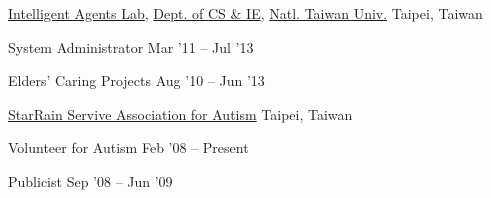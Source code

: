 \documentclass[10pt, a4paper]{article} %
\begin{document}

\headedsection
{\href{http://agent.csie.ntu.edu.tw/}{Intelligent Agents Lab}, 
 \href{http://www.csie.ntu.edu.tw}{Dept. of CS \& IE},
 \href{http://www.ntu.edu.tw}{Natl. Taiwan Univ.}}
{Taipei, Taiwan}{

	\headedsubsection
	{System Administrator}
	{Mar '11 -- Jul '13}
	{}

	\headedsubsection
	{Elders' Caring Projects}
	{Aug '10 -- Jun '13}
	{}
}


\headedsection
{\href{http://goo.gl/2Dmqrj}{StarRain Servive Association for Autism}}
{Taipei, Taiwan}{

	\headedsubsection
	{Volunteer for Autism} 
	{Feb '08 -- Present}
	{}

	\headedsubsection
	{Publicist} 
	{Sep '08 -- Jun '09}
	{} 

}





\spacedhrule{1.2em}{-0.4em} %
\end{document}
